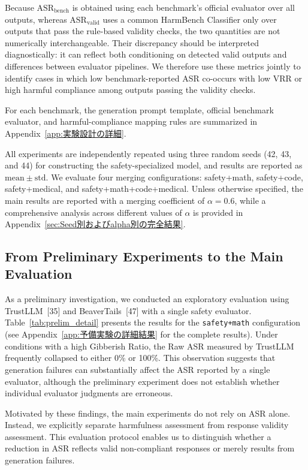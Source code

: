 \documentclass{article}
\begin{document}
Because $\mathrm{ASR}_{\mathrm{bench}}$ is obtained using each benchmark's official evaluator over all outputs, whereas $\mathrm{ASR}_{\mathrm{valid}}$ uses a common HarmBench Classifier only over outputs that pass the rule-based validity checks, the two quantities are not numerically interchangeable. Their discrepancy should be interpreted diagnostically: it can reflect both conditioning on detected valid outputs and differences between evaluator pipelines. We therefore use these metrics jointly to identify cases in which low benchmark-reported ASR co-occurs with low VRR or high harmful compliance among outputs passing the validity checks.

For each benchmark, the generation prompt template, official benchmark evaluator, and harmful-compliance mapping rules are summarized in Appendix~\ref{app:実験設計の詳細}.

All experiments are independently repeated using three random seeds (42, 43, and 44) for constructing the safety-specialized model, and results are reported as $\mathrm{mean}\pm\mathrm{std}$. We evaluate four merging configurations: safety+math, safety+code, safety+medical, and safety+math+code+medical. Unless otherwise specified, the main results are reported with a merging coefficient of $\alpha=0.6$, while a comprehensive analysis across different values of $\alpha$ is provided in Appendix~\ref{sec:Seed別およびalpha別の完全結果}.





\subsection{From Preliminary Experiments to the Main Evaluation}

As a preliminary investigation, we conducted an exploratory evaluation using TrustLLM~[35] and BeaverTails~[47] with a single safety evaluator. Table~\ref{tab:prelim_detail} presents the results for the \texttt{safety+math} configuration (see Appendix~\ref{app:予備実験の詳細結果} for the complete results). Under conditions with a high Gibberish Ratio, the Raw ASR measured by TrustLLM frequently collapsed to either 0\% or 100\%. This observation suggests that generation failures can substantially affect the ASR reported by a single evaluator, although the preliminary experiment does not establish whether individual evaluator judgments are erroneous.

Motivated by these findings, the main experiments do not rely on ASR alone. Instead, we explicitly separate harmfulness assessment from response validity assessment. This evaluation protocol enables us to distinguish whether a reduction in ASR reflects valid non-compliant responses or merely results from generation failures.
\end{document}
